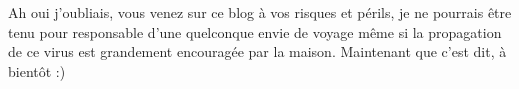 \begin{multicols}{2}
Ah oui j'oubliais, vous venez sur ce blog à vos risques et périls, je ne pourrais être tenu pour responsable d'une quelconque envie de voyage même si la propagation de ce virus est grandement encouragée par la maison. Maintenant que c'est dit, à bientôt :)

\end{multicols}


